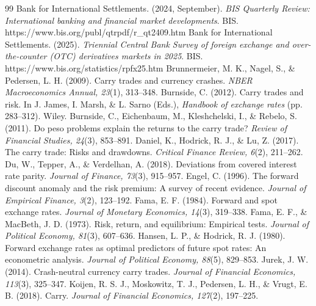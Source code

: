 \documentclass[11pt,a4paper]{article}
\begin{document}
\begin{thebibliography}{99}\setlength{\itemsep}{2pt}\small
{} Bank for International Settlements. (2024, September). \emph{BIS Quarterly Review: International banking and financial market developments}. BIS. https://www.bis.org/publ/qtrpdf/r\_qt2409.htm
 Bank for International Settlements. (2025). \emph{Triennial Central Bank Survey of foreign exchange and over-the-counter (OTC) derivatives markets in 2025}. BIS. https://www.bis.org/statistics/rpfx25.htm
 Brunnermeier, M. K., Nagel, S., \& Pedersen, L. H. (2009). Carry trades and currency crashes. \emph{NBER Macroeconomics Annual, 23}(1), 313--348.
 Burnside, C. (2012). Carry trades and risk. In J. James, I. Marsh, \& L. Sarno (Eds.), \emph{Handbook of exchange rates} (pp. 283--312). Wiley.
 Burnside, C., Eichenbaum, M., Kleshchelski, I., \& Rebelo, S. (2011). Do peso problems explain the returns to the carry trade? \emph{Review of Financial Studies, 24}(3), 853--891.
 Daniel, K., Hodrick, R. J., \& Lu, Z. (2017). The carry trade: Risks and drawdowns. \emph{Critical Finance Review, 6}(2), 211--262.
 Du, W., Tepper, A., \& Verdelhan, A. (2018). Deviations from covered interest rate parity. \emph{Journal of Finance, 73}(3), 915--957.
 Engel, C. (1996). The forward discount anomaly and the risk premium: A survey of recent evidence. \emph{Journal of Empirical Finance, 3}(2), 123--192.
 Fama, E. F. (1984). Forward and spot exchange rates. \emph{Journal of Monetary Economics, 14}(3), 319--338.
 Fama, E. F., \& MacBeth, J. D. (1973). Risk, return, and equilibrium: Empirical tests. \emph{Journal of Political Economy, 81}(3), 607--636.
 Hansen, L. P., \& Hodrick, R. J. (1980). Forward exchange rates as optimal predictors of future spot rates: An econometric analysis. \emph{Journal of Political Economy, 88}(5), 829--853.
 Jurek, J. W. (2014). Crash-neutral currency carry trades. \emph{Journal of Financial Economics, 113}(3), 325--347.
 Koijen, R. S. J., Moskowitz, T. J., Pedersen, L. H., \& Vrugt, E. B. (2018). Carry. \emph{Journal of Financial Economics, 127}(2), 197--225.

\end{thebibliography}
\end{document}
